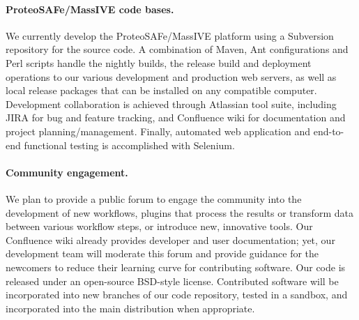 \documentclass[arial,11pt]{article}
\begin{document}
%
%
%
%
%
%

\paragraph{ProteoSAFe/MassIVE code bases.} We currently develop the ProteoSAFe/MassIVE platform using a Subversion repository for the source code. A combination of Maven, Ant configurations and Perl scripts handle the nightly builds, the release build and deployment operations to our various development and production web servers, as well as local release packages that can be installed on any compatible computer.  Development collaboration is achieved through Atlassian tool suite, including JIRA for bug and feature tracking, and Confluence wiki for documentation and project planning/management.  Finally, automated web application and end-to-end functional testing is accomplished with Selenium.

\paragraph{Community engagement.} We plan to provide a public forum to engage the community into the development of new workflows, plugins that process the results or transform data between various workflow steps, or introduce new, innovative tools. Our Confluence wiki already provides developer and user documentation; yet, our development team will moderate this forum and provide guidance for the newcomers to reduce their learning curve for contributing software. Our code is released under an open-source BSD-style license. Contributed software will be incorporated into new branches of our code repository, tested in a sandbox, and incorporated into the main distribution when appropriate.
\end{document}
